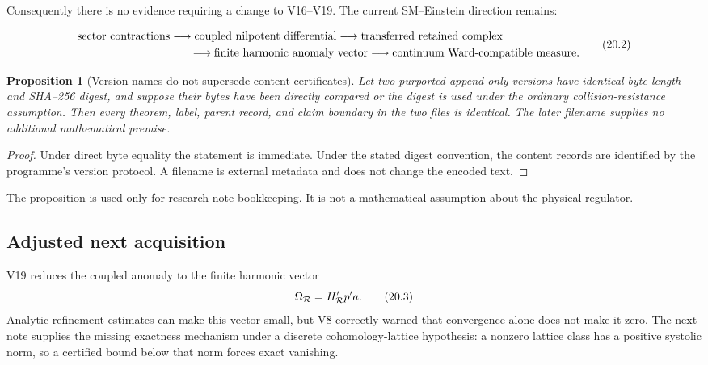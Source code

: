 \documentclass[11pt]{article}
\newtheorem{proposition}[theorem]{Proposition}
\theoremstyle{remark}
\begin{document}
Consequently there is no evidence requiring a change to V16--V19.
The current SM--Einstein direction remains:

\[
\begin{split}
&\text{sector contractions}
 \longrightarrow
 \text{coupled nilpotent differential}
 \longrightarrow
 \text{transferred retained complex}\\
&\hspace{35mm}\longrightarrow
 \text{finite harmonic anomaly vector}
 \longrightarrow
 \text{continuum Ward-compatible measure}.
\end{split}                                                   \tag{20.2}
\]

\begin{proposition}[Version names do not supersede content
certificates]
\label{prop:v12v20-fingerprint}
Let two purported append-only versions have identical byte length and
SHA--256 digest, and suppose their bytes have been directly compared
or the digest is used under the ordinary collision-resistance
assumption.  Then every theorem, label, parent record, and claim
boundary in the two files is identical.  The later filename supplies
no additional mathematical premise.
\end{proposition}

\begin{proof}
Under direct byte equality the statement is immediate.  Under the
stated digest convention, the content records are identified by the
programme's version protocol.  A filename is external metadata and
does not change the encoded text.
\end{proof}

The proposition is used only for research-note bookkeeping.  It is
not a mathematical assumption about the physical regulator.

\subsection{Adjusted next acquisition}

V19 reduces the coupled anomaly to the finite harmonic vector
\[
                         \Omega_{\cal R}=H_{\cal R}'p'a.     \tag{20.3}
\]
Analytic refinement estimates can make this vector small, but V8
correctly warned that convergence alone does not make it zero.  The
next note supplies the missing exactness mechanism under a discrete
cohomology-lattice hypothesis: a nonzero lattice class has a positive
systolic norm, so a certified bound below that norm forces exact
vanishing.
\end{document}
